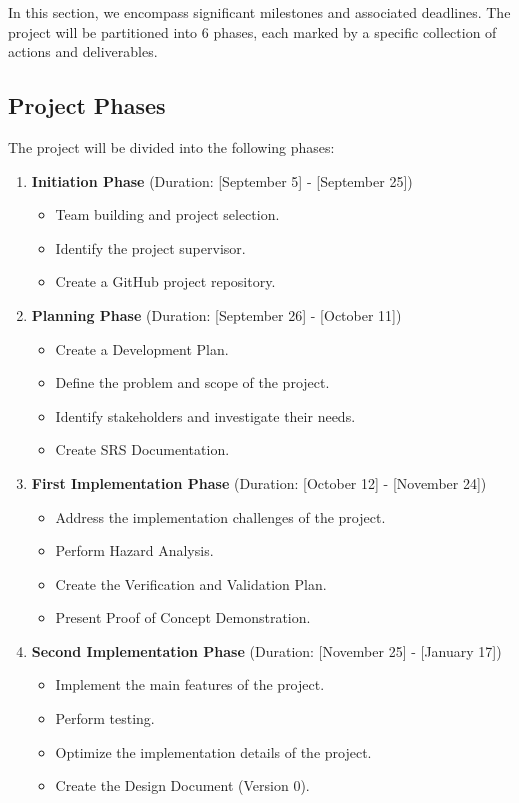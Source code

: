 \documentclass{article}
\begin{document}
In this section, we encompass significant milestones and associated deadlines. The project will be partitioned into 6 phases, each marked by a specific collection of actions and deliverables.

\subsection{Project Phases}

The project will be divided into the following phases:

\begin{enumerate}
  \item \textbf{Initiation Phase} (Duration: [September 5] - [September 25])
  \begin{itemize}
    \item Team building and project selection.
    \item Identify the project supervisor.
    \item Create a GitHub project repository.
  \end{itemize}

  \item \textbf{Planning Phase} (Duration: [September 26] - [October 11])
  \begin{itemize}
    \item Create a Development Plan.
    \item Define the problem and scope of the project.
    \item Identify stakeholders and investigate their needs.
    \item Create SRS Documentation.
  \end{itemize}

  \item \textbf{First Implementation Phase} (Duration: [October 12] - [November 24])
  \begin{itemize}
    \item Address the implementation challenges of the project.
    \item Perform Hazard Analysis.
    \item Create the Verification and Validation Plan.
    \item Present Proof of Concept Demonstration.
  \end{itemize}
  
  \item \textbf{Second Implementation Phase} (Duration: [November 25] - [January 17])
  \begin{itemize}
    \item Implement the main features of the project.
    \item Perform testing.
    \item Optimize the implementation details of the project.
    \item Create the Design Document (Version 0).
  \end{itemize}


\end{enumerate}
\end{document}
